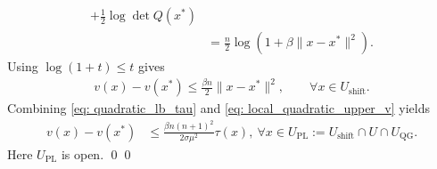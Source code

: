 \documentclass[smallextended]{svjour3}
\let\springerproof\proof
\let\endspringerproof\endproof
\renewenvironment{proof}{\springerproof}{%
  \ifhmode\qed\else\leavevmode\qed\fi\endspringerproof}
\begin{document}
\begin{proof}
\begin{align*}
        +\frac12\log\det Q(x^*) \\
        &=
        \frac n2 \log(1+\beta\|x-x^*\|^2).
    \end{align*}
    Using $\log(1+t)\leq t$ gives
    \begin{align}
        v(x)-v(x^*)
        \leq
        \frac{\beta n}{2}\|x-x^*\|^2,
        \qquad \forall x\in U_{\mathrm{shift}}.
        \label{eq: local_quadratic_upper_v}
    \end{align}
    Combining \eqref{eq: quadratic_lb_tau} and
    \eqref{eq: local_quadratic_upper_v} yields
    \begin{align*}
        v(x)-v(x^*)
        &\leq
        \frac{\beta n (n+1)^2}{2\sigma \mu^2}\tau(x),~ \forall x\in U_{\mathrm{PL}}:=U_{\mathrm{shift}}\cap U\cap U_{\mathrm{QG}}.
    \end{align*}
    Here $U_{\mathrm{PL}}$ is open.
\end{proof}
\end{document}
